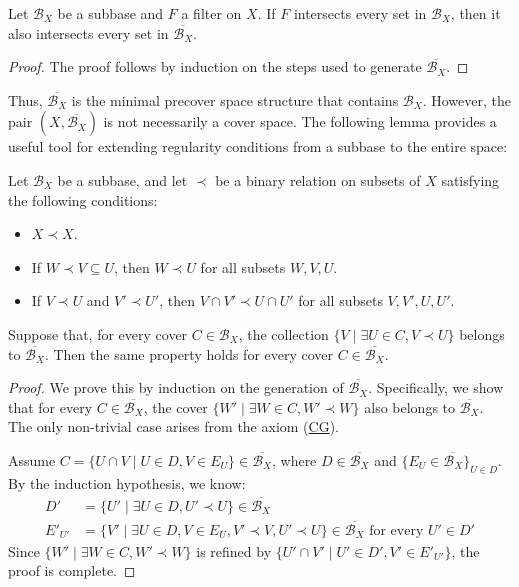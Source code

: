 \documentclass[reqno]{amsart}
\newcommand{\axref}[1]{(\hyperref[ax:#1]{#1})}
\theoremstyle{definition}
\theoremstyle{remark}
\numberwithin{figure}{section}
\newcommand{\rb}{\prec}
\begin{document}
\begin{lem}
Let $\mathcal{B}_X$ be a subbase and $F$ a filter on $X$.
If $F$ intersects every set in $\mathcal{B}_X$, then it also intersects every set in $\overline{\mathcal{B}_X}$.
\end{lem}
\begin{proof}
The proof follows by induction on the steps used to generate $\overline{\mathcal{B}_X}$.
\end{proof}

Thus, $\overline{\mathcal{B}_X}$ is the minimal precover space structure that contains $\mathcal{B}_X$.
However, the pair $(X, \overline{\mathcal{B}_X})$ is not necessarily a cover space.
The following lemma provides a useful tool for extending regularity conditions from a subbase to the entire space:

\begin{lem}
Let $\mathcal{B}_X$ be a subbase, and let $\rb$ be a binary relation on subsets of $X$ satisfying the following conditions:
\begin{itemize}
\item $X \rb X$.
\item If $W \rb V \subseteq U$, then $W \rb U$ for all subsets $W,V,U$.
\item If $V \rb U$ and $V' \rb U'$, then $V \cap V' \rb U \cap U'$ for all subsets $V,V',U,U'$.
\end{itemize}
Suppose that, for every cover $C \in \mathcal{B}_X$, the collection $\{ V \mid \exists U \in C, V \rb U \}$ belongs to $\overline{\mathcal{B}_X}$.
Then the same property holds for every cover $C \in \overline{\mathcal{B}_X}$.
\end{lem}
\begin{proof}
We prove this by induction on the generation of $\overline{\mathcal{B}_X}$.
Specifically, we show that for every $C \in \overline{\mathcal{B}_X}$, the cover $\{ W' \mid \exists W \in C, W' \rb W \}$ also belongs to $\overline{\mathcal{B}_X}$.
The only non-trivial case arises from the axiom \axref{CG}.

Assume $C = \{ U \cap V \mid U \in D, V \in E_U \} \in \overline{\mathcal{B}_X}$, where $D \in \overline{\mathcal{B}_X}$ and $\{ E_U \in \overline{\mathcal{B}_X} \}_{U \in D}$.
By the induction hypothesis, we know:
\begin{align*}
D' & = \{ U' \mid \exists U \in D, U' \rb U \} \in \overline{\mathcal{B}_X} \\
E'_{U'} & = \{ V' \mid \exists U \in D, V \in E_U, V' \rb V, U' \rb U \} \in \overline{\mathcal{B}_X} \text{ for every } U' \in D'
\end{align*}
Since $\{ W' \mid \exists W \in C, W' \rb W \}$ is refined by $\{ U' \cap V' \mid U' \in D', V' \in E'_{U'} \}$, the proof is complete.
\end{proof}
\end{document}
